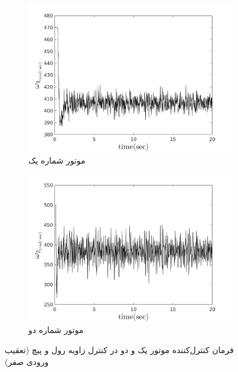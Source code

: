 \begin{figure}[H]
	\centering
	\begin{subfigure}
		\centering
		\includegraphics[width=12cm]{../Figures/MIL/LQIDG/Roll_Pitch/lqidg_roll_pitch_Omega_1.png}
		\caption{موتور شماره یک}
	\end{subfigure}
	\begin{subfigure}
	\centering
	\includegraphics[width=12cm]{../Figures/MIL/LQIDG/Roll_Pitch/lqidg_roll_pitch_Omega_2.png}
	\caption{موتور شماره دو}
\end{subfigure}
	\caption{‫‪فرمان کنترل‌کننده موتور یک و دو در کنترل زاویه رول و پیچ (تعقیب ورودی صفر)}
\end{figure}


